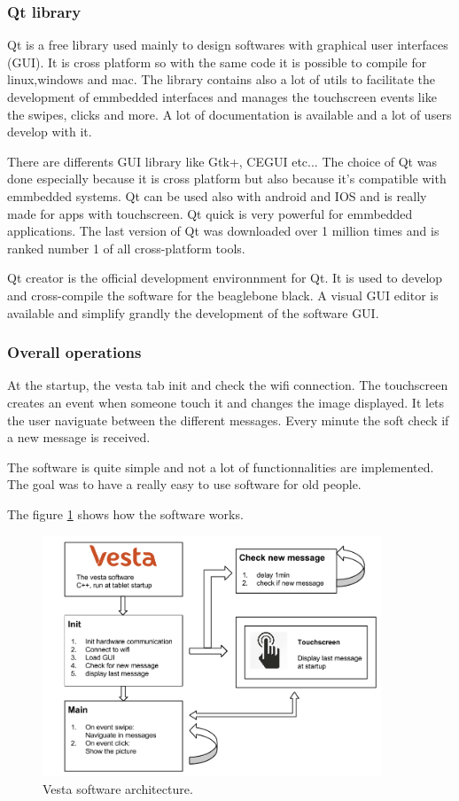 \subsubsection{Qt library}
Qt is a free library used mainly to design softwares with graphical user interfaces (GUI). It is cross platform so with the same code it is possible to compile for linux,windows and mac.
The library contains also a lot of utils to facilitate the development of emmbedded interfaces and manages the touchscreen events like the swipes, clicks and more. A lot of documentation is available and a lot of users develop with it.

There are differents GUI library like Gtk+, CEGUI etc... The choice of Qt was done especially because it is cross platform but also because it's compatible with emmbedded systems. Qt can be used also with android and IOS and is really made for apps with touchscreen. Qt quick is very powerful for emmbedded applications. The last version of Qt was downloaded over 1 million times and is ranked number 1 of all cross-platform tools.

Qt creator is the official development environnment for Qt. It is used to develop and cross-compile the software for the beaglebone black. A visual GUI editor is available and simplify grandly the development of the software GUI.

\subsubsection{Overall operations}
At the startup, the vesta tab init and check the wifi connection. The touchscreen creates an event when someone touch it and changes the image displayed. It lets the user naviguate between the different messages. Every minute the soft check if a new message is received.

The software is quite simple and not a lot of functionnalities are implemented. The goal was to have a really easy to use software for old people.

The figure \ref{fig:soft archi} shows how the software works.

\begin{figure}[!htb]
    \centering
    \includegraphics[width=0.9\textwidth,keepaspectratio]{chap/softFig/vesta_software_diagram2}
    \caption{Vesta software architecture.}
    \label{fig:soft archi}
\end{figure}

